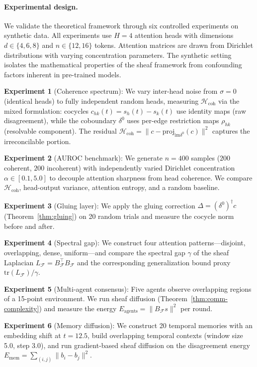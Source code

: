 \documentclass[11pt,a4paper]{article}
\theoremstyle{plain}
\theoremstyle{definition}
\theoremstyle{remark}
\newcommand{\cF}{\mathcal{F}}
\newcommand{\tr}{\mathrm{tr}}
\newcommand{\im}{\mathrm{im}}
\newcommand{\Hcoh}{\mathcal{H}_{\mathrm{coh}}}
\begin{document}
\paragraph{Experimental design.}
We validate the theoretical framework through six controlled experiments on synthetic data. All experiments use $H=4$ attention heads with dimensions $d \in \{4,6,8\}$ and $n \in \{12, 16\}$ tokens. Attention matrices are drawn from Dirichlet distributions with varying concentration parameters. The synthetic setting isolates the mathematical properties of the sheaf framework from confounding factors inherent in pre-trained models.

\textbf{Experiment 1} (Coherence spectrum): We vary inter-head noise from $\sigma=0$ (identical heads) to fully independent random heads, measuring $\Hcoh$ via the mixed formulation: cocycles $c_{hk}(t) = s_h(t) - s_k(t)$ use identity maps (raw disagreement), while the coboundary $\delta^0$ uses per-edge restriction maps $\rho_{hk}$ (resolvable component). The residual $\Hcoh = \|c - \mathrm{proj}_{\im \delta^0}(c)\|^2$ captures the irreconcilable portion.

\textbf{Experiment 2} (AUROC benchmark): We generate $n = 400$ samples ($200$ coherent, $200$ incoherent) with independently varied Dirichlet concentration $\alpha \in [0.1, 5.0]$ to decouple attention sharpness from head coherence. We compare $\Hcoh$, head-output variance, attention entropy, and a random baseline.

\textbf{Experiment 3} (Gluing layer): We apply the gluing correction $\Delta = (\delta^0)^\dagger c$ (Theorem~\ref{thm:gluing}) on 20 random trials and measure the cocycle norm before and after.

\textbf{Experiment 4} (Spectral gap): We construct four attention patterns---disjoint, overlapping, dense, uniform---and compare the spectral gap $\gamma$ of the sheaf Laplacian $L_\cF = B_\cF^\top B_\cF$ and the corresponding generalization bound proxy $\tr(L_\cF)/\gamma$.

\textbf{Experiment 5} (Multi-agent consensus): Five agents observe overlapping regions of a 15-point environment. We run sheaf diffusion (Theorem~\ref{thm:comm-complexity}) and measure the energy $E_{\mathrm{agents}} = \|B_\cF s\|^2$ per round.

\textbf{Experiment 6} (Memory diffusion): We construct 20 temporal memories with an embedding shift at $t=12.5$, build overlapping temporal contexts (window size 5.0, step 3.0), and run gradient-based sheaf diffusion on the disagreement energy $E_{\mathrm{mem}} = \sum_{(i,j)} \|b_i - b_j\|^2$.
\end{document}
